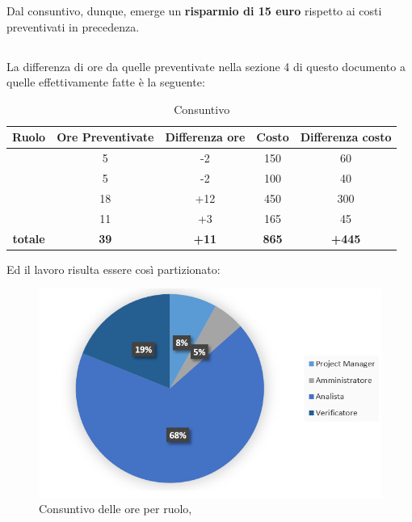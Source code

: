 Dal consuntivo, dunque, emerge un \textbf{risparmio di 15 euro} rispetto ai costi preventivati in precedenza.

\newpage

\subsection{\ARD}
La differenza di ore da quelle preventivate nella sezione 4 di questo documento a quelle effettivamente fatte è la seguente:

\begin{table}[h]
	\begin{center}
		\begin{tabular}{|c|c|c|c|c|}
			\hline
			\textbf{Ruolo}	& \textbf{Ore Preventivate} & \textbf{Differenza ore} & \textbf{Costo} & \textbf{Differenza costo}\\
			\hline
			\Pm &	5  & -2 & 150 & 60	\\
			\hline
			\Am	&	5 & -2 & 100 & 40\\
			\hline
			\An	&	18 & +12 & 450 & 300\\
			\hline
			\Ver &	11 & +3 & 165 & 45\\
			\hline
			\textbf{totale}	&	\textbf{39} & \textbf{+11} & \textbf{865} & \textbf{+445}\\
			\hline
		\end{tabular}
	\end{center}
	\caption{Consuntivo \ARD}
\end{table}

Ed il lavoro risulta essere così partizionato:

\begin{figure}[H]
	\centering 
	\includegraphics[scale=1.25]{Immagini/Consuntivo/ConsuntivoARD.png}
	\caption{Consuntivo delle ore per ruolo, \ARM}
\end{figure}

